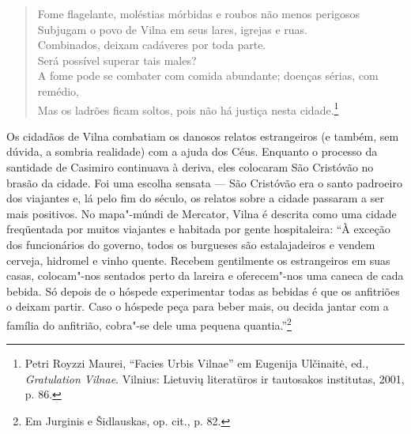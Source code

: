 \begin{verse}
Fome flagelante, moléstias mórbidas e roubos não \qb{}menos perigosos\\
Subjugam o povo de Vilna em seus lares, igrejas e \qb{}ruas.\\
Combinados, deixam cadáveres por toda parte.\\
Será possível superar tais males?\\
A fome pode se combater com comida abundante; \qb{}doenças sérias, com
remédio,\\
Mas os ladrões ficam soltos, pois não há justiça \qb{}nesta cidade.\footnote{Petri
  Royzzi Maurei, ``Facies Urbis Vilnae'' em Eugenija Ulčinaitė, ed.,
  \emph{Gratulation Vilnae}. Vilnius: Lietuvių literatūros ir tautosakos
  institutas, 2001, p. 86.}
\end{verse}

%

\asterisc

Os cidadãos de Vilna combatiam os danosos relatos estrangeiros (e
também, sem dúvida, a sombria realidade) com a ajuda dos Céus. Enquanto
o processo da santidade de Casimiro continuava à deriva, eles colocaram
São Cristóvão no brasão da cidade. Foi uma escolha sensata --- São
Cristóvão era o santo padroeiro dos viajantes e, lá pelo fim do século,
os relatos sobre a cidade passaram a ser mais positivos. No mapa"-múndi
de Mercator, Vilna é descrita como uma cidade freqüentada por muitos
viajantes e habitada por gente hospitaleira: ``À exceção dos
funcionários do governo, todos os burgueses são estalajadeiros e vendem
cerveja, hidromel e vinho quente. Recebem gentilmente os estrangeiros em
suas casas, colocam"-nos sentados perto da lareira e oferecem"-nos uma
caneca de cada bebida. Só depois de o hóspede experimentar todas as
bebidas é que os anfitriões o deixam partir. Caso o hóspede peça para
beber mais, ou decida jantar com a família do anfitrião, cobra"-se dele
uma pequena quantia.''\footnote{Em Jurginis e Šidlauskas, op. cit., p.
  82.}

